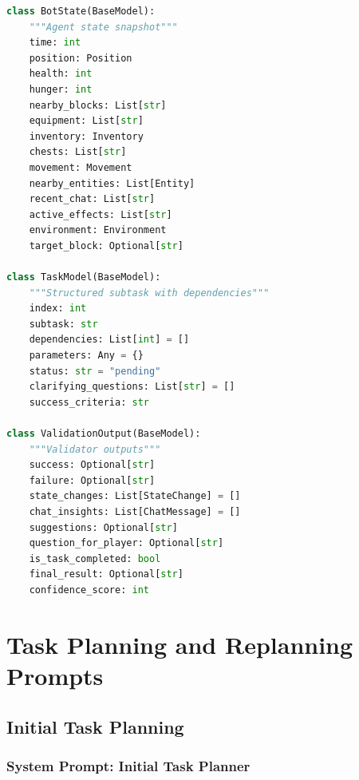 \begin{FullWidthListing}
\caption{Production runtime schemas in Pydantic.}
\label{lst:schemas}
\begin{lstlisting}[language=Python]
class BotState(BaseModel):
    """Agent state snapshot"""
    time: int
    position: Position
    health: int
    hunger: int
    nearby_blocks: List[str]
    equipment: List[str]
    inventory: Inventory
    chests: List[str]
    movement: Movement
    nearby_entities: List[Entity]
    recent_chat: List[str]
    active_effects: List[str]
    environment: Environment
    target_block: Optional[str]

class TaskModel(BaseModel):
    """Structured subtask with dependencies"""
    index: int
    subtask: str
    dependencies: List[int] = []
    parameters: Any = {}
    status: str = "pending"
    clarifying_questions: List[str] = []
    success_criteria: str

class ValidationOutput(BaseModel):  
    """Validator outputs"""
    success: Optional[str]
    failure: Optional[str]
    state_changes: List[StateChange] = []
    chat_insights: List[ChatMessage] = []
    suggestions: Optional[str]
    question_for_player: Optional[str]
    is_task_completed: bool
    final_result: Optional[str]
    confidence_score: int
\end{lstlisting}
\end{FullWidthListing}

\clearpage

\section{Task Planning and Replanning Prompts}
\label{app:planning}

\vspace{10pt}

\subsection{Initial Task Planning}

\vspace{10pt}

\subsubsection{System Prompt: Initial Task Planner}



